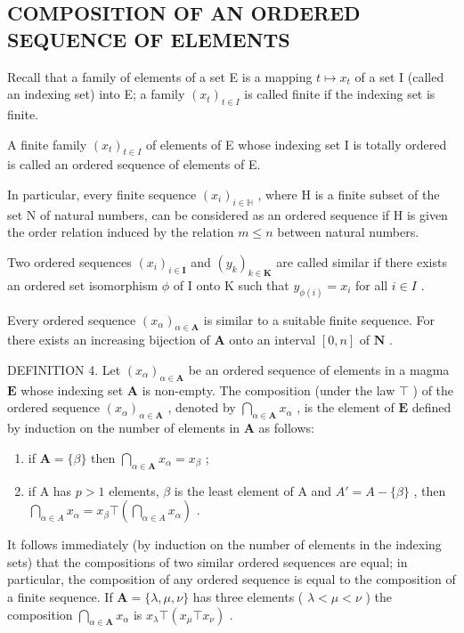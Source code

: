 \subsection{COMPOSITION OF AN ORDERED SEQUENCE OF ELEMENTS}

Recall that a family of elements of a set E is a mapping \(t \mapsto x_{t}\) of a set I (called an indexing set) into E; a family \((x_{t})_{t \in I}\) is called finite if the indexing set is finite.

A finite family \((x_{t})_{t\in I}\) of elements of E whose indexing set I is totally ordered is called an ordered sequence of elements of E.

In particular, every finite sequence \((x_{i})_{i\in\mathbb{H}}\) , where H is a finite subset of the set N of natural numbers, can be considered as an ordered sequence if H is given the order relation induced by the relation \(m \leqslant n\) between natural numbers.

Two ordered sequences \((x_{i})_{i\in\mathbf{I}}\) and \((y_{k})_{k\in\mathbf{K}}\) are called similar if there exists an ordered set isomorphism \(\phi\) of I onto K such that \(y_{\phi(i)} = x_{i}\) for all \(i \in I\) .

Every ordered sequence \((x_{\alpha})_{\alpha \in \mathbf{A}}\) is similar to a suitable finite sequence. For there exists an increasing bijection of \(\mathbf{A}\) onto an interval \([0, n]\) of \(\mathbf{N}\) .

DEFINITION 4. Let \((x_{\alpha})_{\alpha \in \mathbf{A}}\) be an ordered sequence of elements in a magma \(\mathbf{E}\) whose indexing set \(\mathbf{A}\) is non-empty. The composition (under the law \(\top\) ) of the ordered sequence \((x_{\alpha})_{\alpha \in \mathbf{A}}\) , denoted by \(\bigcap_{\alpha \in \mathbf{A}} x_{\alpha}\) , is the element of \(\mathbf{E}\) defined by induction on the number of elements in \(\mathbf{A}\) as follows:

\begin{enumerate}
\def\labelenumi{(\arabic{enumi})}
\item
  if \(\mathbf{A} = \{\beta\}\) then \(\bigcap_{\alpha \in \mathbf{A}} x_{\alpha} = x_{\beta}\) ;
\item
  if A has \(p > 1\) elements, \(\beta\) is the least element of A and \(A' = A - \{\beta\}\) , then \(\bigcap_{\alpha \in A} x_{\alpha} = x_{\beta} \top \left( \bigcap_{\alpha \in A} x_{\alpha} \right)\) .
\end{enumerate}

It follows immediately (by induction on the number of elements in the indexing sets) that the compositions of two similar ordered sequences are equal; in particular, the composition of any ordered sequence is equal to the composition of a finite sequence. If \(\mathbf{A} = \{\lambda, \mu, \nu\}\) has three elements ( \(\lambda < \mu < \nu\) ) the composition \(\bigcap_{\alpha \in \mathbf{A}} x_{\alpha}\) is \(x_{\lambda} \top (x_{\mu} \top x_{\nu})\) .

